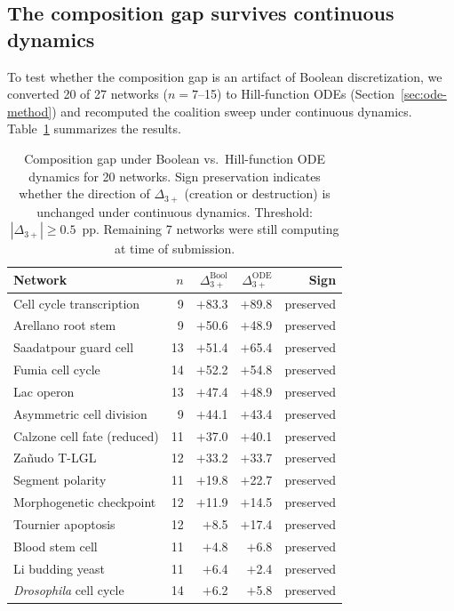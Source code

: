 \documentclass[10pt]{article}
\begin{document}
\subsection{The composition gap survives continuous dynamics}
\label{sec:ode-results}

To test whether the composition gap is an artifact of Boolean
discretization, we converted 20 of 27 networks ($n = 7$--15) to
Hill-function ODEs (Section~\ref{sec:ode-method}) and recomputed
the coalition sweep under continuous dynamics.
Table~\ref{tab:ode} summarizes the results.

\begin{table}[t]
\centering
\caption{Composition gap under Boolean vs.\ Hill-function ODE
dynamics for 20 networks. Sign preservation indicates whether the
direction of $\Delta_{3+}$ (creation or destruction) is unchanged
under continuous dynamics. Threshold: $|\Delta_{3+}| \geq 0.5$~pp.
Remaining 7 networks were still computing at time of submission.}
\label{tab:ode}
\begin{tabular}{lrrrr}
\toprule
Network & $n$ & $\Delta_{3+}^{\mathrm{Bool}}$ & $\Delta_{3+}^{\mathrm{ODE}}$ & Sign \\
\midrule
Cell cycle transcription & 9 & $+$83.3 & $+$89.8 & preserved \\
Arellano root stem & 9 & $+$50.6 & $+$48.9 & preserved \\
Saadatpour guard cell & 13 & $+$51.4 & $+$65.4 & preserved \\
Fumia cell cycle & 14 & $+$52.2 & $+$54.8 & preserved \\
Lac operon & 13 & $+$47.4 & $+$48.9 & preserved \\
Asymmetric cell division & 9 & $+$44.1 & $+$43.4 & preserved \\
Calzone cell fate (reduced) & 11 & $+$37.0 & $+$40.1 & preserved \\
Za\~nudo T-LGL & 12 & $+$33.2 & $+$33.7 & preserved \\
Segment polarity & 11 & $+$19.8 & $+$22.7 & preserved \\
Morphogenetic checkpoint & 12 & $+$11.9 & $+$14.5 & preserved \\
Tournier apoptosis & 12 & $+$8.5 & $+$17.4 & preserved \\
Blood stem cell & 11 & $+$4.8 & $+$6.8 & preserved \\
Li budding yeast & 11 & $+$6.4 & $+$2.4 & preserved \\
\emph{Drosophila} cell cycle & 14 & $+$6.2 & $+$5.8 & preserved \\

\end{tabular}
\end{table}
\end{document}
